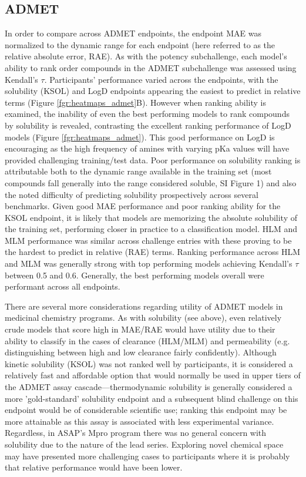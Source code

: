 \documentclass[journal=jcim,manuscript=article]{achemso}
\begin{document}
\subsection{ADMET}
In order to compare across ADMET endpoints, the endpoint MAE was normalized to the dynamic range for each endpoint (here referred to as the relative absolute error, RAE). As with the potency subchallenge, each model's ability to rank order compounds in the ADMET subchallenge was assessed using Kendall's $\tau$. Participants' performance varied across the endpoints, with the solubility (KSOL) and LogD endpoints appearing the easiest to predict in relative terms (Figure \ref{fgr:heatmaps_admet}B). However when ranking ability is examined, the inability of even the best performing models to rank compounds by solubility is revealed, contrasting the excellent ranking performance of LogD models (Figure \ref{fgr:heatmaps_admet}). This good performance on LogD is encouraging as the high frequency of amines with varying pKa values will have provided challenging training/test data. Poor performance on solubility ranking is attributable both to the dynamic range available in the training set (most compounds fall generally into the range considered soluble, SI Figure 1) and also the noted difficulty of predicting solubility prospectively across several benchmarks\cite{llompart_minoletti_baybekov_horvath_marcou_varnek_2024}. Given good MAE performance and poor ranking ability for the KSOL endpoint, it is likely that models are memorizing the absolute solubility of the training set, performing closer in practice to a classification model. HLM and MLM performance was similar across challenge entries with these proving to be the hardest to predict in relative (RAE) terms. Ranking performance across HLM and MLM was generally strong with top performing models achieving Kendall's $\tau$ between 0.5 and 0.6. Generally, the best performing models overall were performant across all endpoints.

There are several more considerations regarding utility of ADMET models in medicinal chemistry programs. As with solubility (see above), even relatively crude models that score high in MAE/RAE would have utility due to their ability to classify in the cases of clearance (HLM/MLM) and permeability (e.g. distinguishing between high and low clearance fairly confidently). Although kinetic solubility (KSOL) was not ranked well by participants, it is considered a relatively fast and affordable option that would normally be used in upper tiers of the ADMET assay cascade---thermodynamic solubility is generally considered a more 'gold-standard' solubility endpoint and a subsequent blind challenge on this endpoint would be of considerable scientific use; ranking this endpoint may be more attainable as this assay is associated with less experimental variance.\cite{llompart_minoletti_baybekov_horvath_marcou_varnek_2024} Regardless, in ASAP's Mpro program there was no general concern with solubility due to the nature of the lead series. Exploring novel chemical space may have presented more challenging cases to participants where it is probably that relative performance would have been lower.
\end{document}
